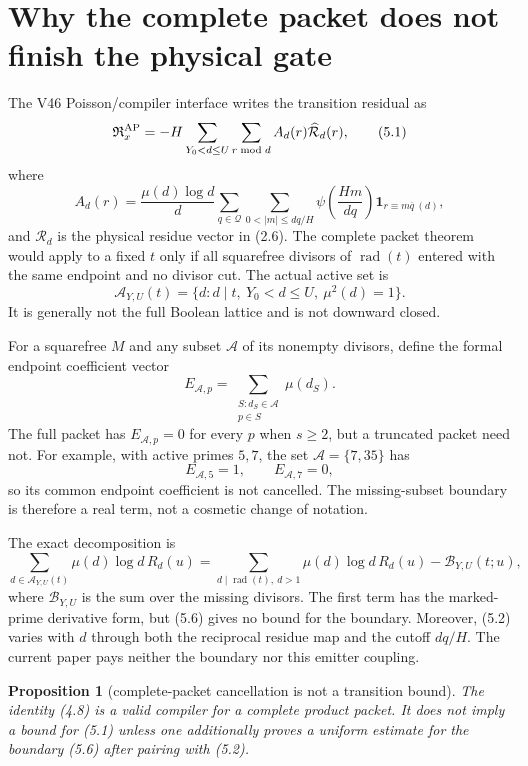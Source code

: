 \documentclass[11pt]{article}
\newtheorem{proposition}[theorem]{Proposition}
\newcommand{\one}{\mathbf 1}
\newcommand{\muM}{\mu}
\begin{document}
\section{Why the complete packet does not finish the physical gate}

The V46 Poisson/compiler interface writes the transition residual as
\[
 \mathfrak R_x^{\rm AP}
 =-H\sum_{Y_0<d\le U}\sum_{r\bmod d}
 A_d(r)\widehat{\mathcal R}_d(r),
 \tag{5.1}
\]
where
\[
 A_d(r)=\frac{\muM(d)\log d}{d}
 \sum_{q\in\mathcal Q}\sum_{0<|m|\le dq/H}
 \psi\!\left(\frac{Hm}{dq}\right)
 \one_{r\equiv m\overline q\ (d)},
 \tag{5.2}
\]
and $\mathcal R_d$ is the physical residue vector in (2.6).  The complete
packet theorem would apply to a fixed $t$ only if all squarefree divisors of
$\operatorname{rad}(t)$ entered with the same endpoint and no divisor cut.
The actual active set is
\[
 \mathcal A_{Y,U}(t)=\{d:d\mid t,\ Y_0<d\le U,\ \muM^2(d)=1\}.
 \tag{5.3}
\]
It is generally not the full Boolean lattice and is not downward closed.

For a squarefree $M$ and any subset $\mathcal A$ of its nonempty divisors,
define the formal endpoint coefficient vector
\[
 E_{\mathcal A,p}=
 \sum_{\substack{S:d_S\in\mathcal A\\p\in S}}
 \muM(d_S).
 \tag{5.4}
\]
The full packet has $E_{\mathcal A,p}=0$ for every $p$ when $s\ge2$, but a
truncated packet need not.  For example, with active primes $5,7$, the set
${\mathcal A}=\{7,35\}$ has
\[
 E_{\mathcal A,5}=1,\qquad E_{\mathcal A,7}=0,
 \tag{5.5}
\]
so its common endpoint coefficient is not cancelled.  The missing-subset
boundary is therefore a real term, not a cosmetic change of notation.

The exact decomposition is
\[
 \sum_{d\in\mathcal A_{Y,U}(t)}\muM(d)\log d\,R_d(u)
 =\sum_{d\mid\operatorname{rad}(t),\ d>1}
   \muM(d)\log d\,R_d(u)
 -\mathcal B_{Y,U}(t;u),
 \tag{5.6}
\]
where $\mathcal B_{Y,U}$ is the sum over the missing divisors.  The first
term has the marked-prime derivative form, but (5.6) gives no bound for the
boundary.  Moreover, (5.2) varies with $d$ through both the reciprocal
residue map and the cutoff $dq/H$.  The current paper pays neither the
boundary nor this emitter coupling.

\begin{proposition}[complete-packet cancellation is not a transition bound]
\label{prop:boundary}
The identity (4.8) is a valid compiler for a complete product packet.  It does
not imply a bound for (5.1) unless one additionally proves a uniform estimate
for the boundary (5.6) after pairing with (5.2).
\end{proposition}
\end{document}
